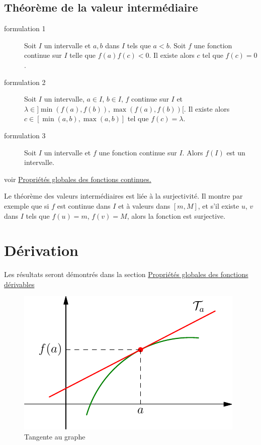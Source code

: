\subsection{Théorème de la valeur intermédiaire}
\begin{thm}
 \begin{description}
  \item[formulation 1]Soit $I$ un intervalle et $a, b$ dans $I$ tels que $a<b$. Soit $f$ une fonction continue sur $I$ telle que $f(a)f(c)<0$. Il existe alors $c$ tel que $f(c)=0$.
  \item[formulation 2]Soit $I$ un intervalle, $a\in I$, $b\in I$, $f$ continue sur $I$ et $\lambda \in ]\min(f(a),f(b)),\max(f(a),f(b))[$. Il existe alors $c\in[\min(a,b),\max(a,b)]$ tel que $f(c)=\lambda$.
  \item[formulation 3]Soit $I$ un intervalle et $f$ une fonction continue sur $I$. Alors $f(I)$ est un intervalle.
 \end{description}
\end{thm}
voir \href{\baseurl C2072.pdf}{Propriétés globales des fonctions continues.}
\begin{rem}
Le théorème des valeurs intermédiaires est liée à la surjectivité. Il montre par exemple que si $f$ est continue dans $I$ et à valeurs dans $[m,M]$, et s'il existe $u$, $v$ dans $I$ tels que $f(u)=m$, $f(v) = M$, alors la fonction est surjective. 
\end{rem}

\section{Dérivation}
Les résultats seront démontrés dans la section \href{\baseurl C2070.pdf}{Propriétés globales des fonctions dérivables}
\begin{figure}[h]
 \centering
 \includegraphics{./C2004_13.pdf}
 \caption{Tangente au graphe}
 \label{fig:tan}
\end{figure}


